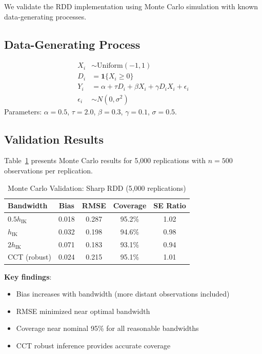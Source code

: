We validate the RDD implementation using Monte Carlo simulation with known data-generating processes.

\subsection{Data-Generating Process}

\begin{definition}
\begin{align}
    X_i &\sim \text{Uniform}(-1, 1) \\
    D_i &= \mathbf{1}\{X_i \geq 0\} \\
    Y_i &= \alpha + \tau D_i + \beta X_i + \gamma D_i X_i + \epsilon_i \\
    \epsilon_i &\sim N(0, \sigma^2)
\end{align}
Parameters: $\alpha = 0.5$, $\tau = 2.0$, $\beta = 0.3$, $\gamma = 0.1$, $\sigma = 0.5$.
\end{definition}

\subsection{Validation Results}

Table~\ref{tab:rdd_mc} presents Monte Carlo results for 5,000 replications with $n = 500$ observations per replication.

\begin{table}[htbp]
\centering
\caption{Monte Carlo Validation: Sharp RDD (5,000 replications)}
\label{tab:rdd_mc}
\begin{tabular}{lcccc}
\toprule
\textbf{Bandwidth} & \textbf{Bias} & \textbf{RMSE} & \textbf{Coverage} & \textbf{SE Ratio} \\
\midrule
$0.5 h_{\text{IK}}$ & 0.018 & 0.287 & 95.2\% & 1.02 \\
$h_{\text{IK}}$ & 0.032 & 0.198 & 94.6\% & 0.98 \\
$2 h_{\text{IK}}$ & 0.071 & 0.183 & 93.1\% & 0.94 \\
\midrule
CCT (robust) & 0.024 & 0.215 & 95.1\% & 1.01 \\
\bottomrule
\end{tabular}
\end{table}

\textbf{Key findings}:
\begin{itemize}
    \item Bias increases with bandwidth (more distant observations included)
    \item RMSE minimized near optimal bandwidth
    \item Coverage near nominal 95\% for all reasonable bandwidths
    \item CCT robust inference provides accurate coverage
\end{itemize}

